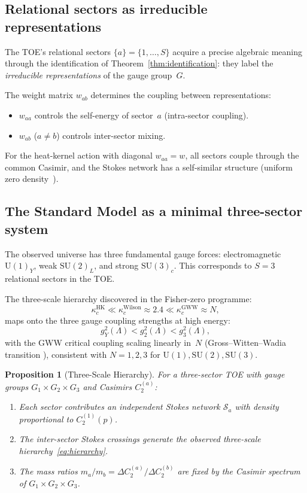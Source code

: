 \documentclass[12pt]{article}
\newtheorem{proposition}[theorem]{Proposition}
\theoremstyle{definition}
\theoremstyle{remark}
\newcommand{\SU}{\mathrm{SU}}
\newcommand{\U}{\mathrm{U}}
\begin{document}
\subsection{Relational sectors as irreducible representations}

The TOE's relational sectors $\{a\} = \{1,\ldots,S\}$ acquire a
precise algebraic meaning through the identification of
Theorem~\ref{thm:identification}: they label the \emph{irreducible
representations} of the gauge group~$G$.

The weight matrix $w_{ab}$ determines the coupling between
representations:
\begin{itemize}
\item $w_{aa}$ controls the self-energy of sector~$a$ (intra-sector coupling).
\item $w_{ab}$ ($a \neq b$) controls inter-sector mixing.
\end{itemize}

For the heat-kernel action with diagonal $w_{aa} = w$, all sectors
couple through the common Casimir, and the Stokes network has a
self-similar structure (uniform zero density~\cite{OlbrykPsi2026}).

\subsection{The Standard Model as a minimal three-sector system}

The observed universe has three fundamental gauge forces:
electromagnetic $\U(1)_Y$, weak $\SU(2)_L$, and strong $\SU(3)_c$.
This corresponds to $S=3$ relational sectors in the TOE.

The three-scale hierarchy discovered in the Fisher-zero programme:
\begin{equation}\label{eq:hierarchy}
\kappa_c^{\mathrm{HK}} \ll \kappa_c^{\mathrm{Wilson}}
\approx 2.4 \ll \kappa_c^{\mathrm{GWW}} \approx N,
\end{equation}
maps onto the three gauge coupling strengths at high energy:
\begin{equation}\label{eq:coupling_hierarchy}
g_Y^2(\Lambda) < g_2^2(\Lambda) < g_3^2(\Lambda),
\end{equation}
with the GWW critical coupling scaling linearly in~$N$
(Gross--Witten--Wadia transition \cite{GrossWitten1980}),
consistent with $N=1, 2, 3$ for $\U(1), \SU(2), \SU(3)$.

\begin{proposition}[Three-Scale Hierarchy]\label{prop:hierarchy}
For a three-sector TOE with gauge groups
$G_1 \times G_2 \times G_3$ and Casimirs $C_2^{(a)}$:
\begin{enumerate}
\item Each sector contributes an independent Stokes network
  $\mathcal{S}_a$ with density proportional to $C_2^{(1)}(p)$.
\item The inter-sector Stokes crossings generate
  the observed three-scale hierarchy~\eqref{eq:hierarchy}.
\item The mass ratios $m_a/m_b = \Delta C_2^{(a)}/\Delta C_2^{(b)}$
  are fixed by the Casimir spectrum of $G_1 \times G_2 \times G_3$.
\end{enumerate}
\end{proposition}
\end{document}
